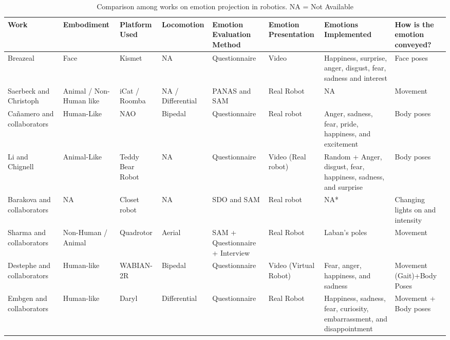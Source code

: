 \clearpage
\begin{table}[h]
\caption{Comparison among works on emotion projection in robotics. NA = Not Available}
\label{table:comparison_work_emotion_projection}
\begin{center}
\tiny %
\begin{tabular}{|p{2.3 cm}|p{1.5 cm}|p{1.3 cm}|p{1.4 cm}|p{1.4 cm}|p{1.0 cm}|p{2.2 cm}|p{1.4 cm}|}
\hline 
\textbf{Work}  & \textbf{Embodiment} & \textbf{Platform Used} & \textbf{Locomotion} & \textbf{Emotion Evaluation Method} & \textbf{Emotion Presentation} & \textbf{Emotions Implemented}  & \textbf{How is the emotion conveyed?}\\ 
\hline 
Breazeal~\cite{Breazeal2002}  & Face & Kismet & NA & Questionnaire & Video & Happiness, surprise, anger, disgust, fear, sadness and interest &  Face poses\\ 
\hline
Saerbeck and Christoph~\cite{Saerbeck2010} & Animal / Non-Human like& iCat / Roomba & NA / Differential &PANAS and SAM & Real Robot & NA &  Movement\\
\hline 
Ca\~namero and collaborators~\cite{Canamero2010,Beck2010}&Human-Like & NAO & Bipedal & Questionnaire & Real robot & Anger, sadness, fear, pride, happiness, and excitement &  Body poses\\
\hline
Li and Chignell~\cite{Li2011}& Animal-Like& Teddy Bear Robot& NA & Questionnaire & Video (Real robot) & Random + Anger, disgust, fear, happiness, sadness, and surprise  & Body poses\\ 
\hline
Barakova and collaborators~\cite{Barakova2013} & NA & Closet robot& NA & SDO and SAM & Real robot & NA*  & Changing lights on and intensity\\ 
\hline
Sharma and collaborators~\cite{Sharma2013} & Non-Human / Animal & Quadrotor & Aerial & SAM + Questionnaire + Interview &  Real Robot & Laban's poles & Movement\\
\hline
Destephe and collaborators~\cite{Destephe2013b}&Human-like & WABIAN-2R & Bipedal & Questionnaire & Video (Virtual Robot) & Fear, anger, happiness, and sadness & Movement (Gait)+Body Poses\\
\hline 
Embgen and collaborators~\cite{Arras2012} & Human-like & Daryl &  Differential& Questionnaire & Real Robot & Happiness, sadness, fear, curiosity, embarrassment, and disappointment & Movement + Body poses \\ 

\end{tabular}
\end{center}
\end{table}
